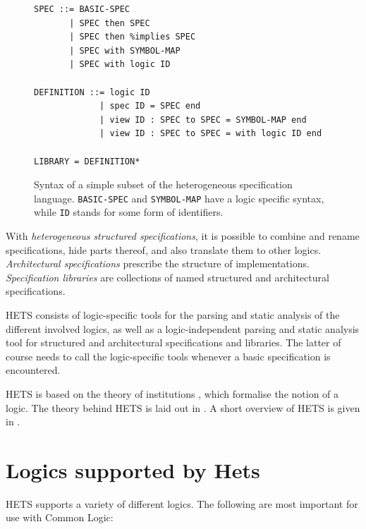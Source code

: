 \documentclass{article}
\newcommand{\normalTEXTSC}[2]{{#1\scriptsize#2}}
\newcommand     {\Hets}{\normalTEXTSC{H}{ETS}\xspace}
\begin{document}
\begin{figure}[ht]
\centering
{\small
\begin{lstlisting}[morekeywords={then,with,logic,spec,end,view,to}]
SPEC ::= BASIC-SPEC
       | SPEC then SPEC
       | SPEC then %implies SPEC
       | SPEC with SYMBOL-MAP
       | SPEC with logic ID

DEFINITION ::= logic ID
             | spec ID = SPEC end
             | view ID : SPEC to SPEC = SYMBOL-MAP end
             | view ID : SPEC to SPEC = with logic ID end

LIBRARY = DEFINITION*
\end{lstlisting}
}
\caption{Syntax of a simple subset of the heterogeneous
specification language.
\texttt{BASIC-SPEC} and \texttt{SYMBOL-MAP} have a logic
specific syntax, while \texttt{ID} stands for some form of
identifiers.\label{fig:lang}
}
\end{figure}

With \emph{heterogeneous structured specifications}, it is possible to
combine and rename specifications, hide parts thereof, and also
translate them to other logics. \emph{Architectural specifications}
prescribe the structure of implementations.  \emph{Specification
  libraries} are collections of named structured and architectural
specifications.

\Hets consists of logic-specific tools for the parsing and static
analysis of the different involved logics, as well as a
logic-independent parsing and static analysis tool for structured and
architectural specifications and libraries. The latter of course needs
to call the logic-specific tools whenever a basic specification is
encountered.

\Hets is based on the theory of institutions \cite{GoguenBurstall92},
which formalise the notion of a logic. The theory behind \Hets is laid
out in \cite{Habil}. A short overview of \Hets is given in
\cite{MossakowskiEA06,MossakowskiEtAl07b}.


\section{Logics supported by Hets}

\Hets supports a variety of different logics.   The following are most important for use with Common Logic:
\end{document}

